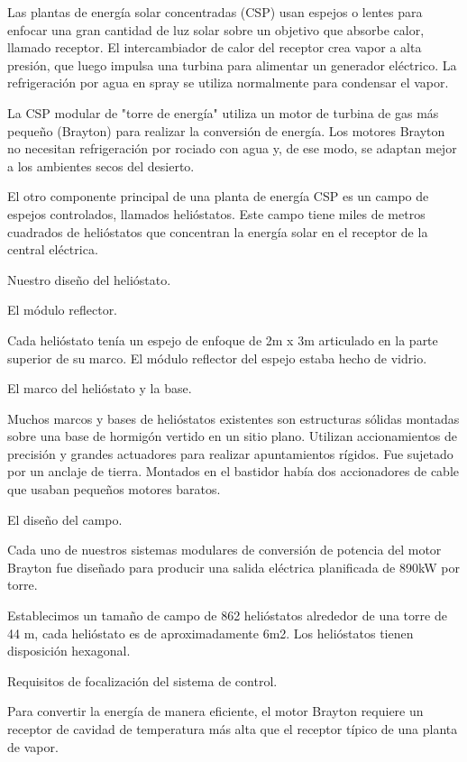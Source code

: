 \documentclass[12pt]{article}
\begin{document}
Las plantas de energía solar concentradas (CSP) usan espejos o lentes para enfocar una gran cantidad de luz solar sobre un objetivo que absorbe calor, llamado receptor. El intercambiador de calor del receptor crea vapor a alta presión, que luego impulsa una turbina para alimentar un generador eléctrico. La refrigeración por agua en spray se utiliza normalmente para condensar el vapor.

La CSP modular de "torre de energía" utiliza un motor de turbina de gas más pequeño (Brayton) para realizar la conversión de energía. Los motores Brayton no necesitan refrigeración por rociado con agua y, de ese modo, se adaptan mejor a los ambientes secos del desierto.

El otro componente principal de una planta de energía CSP es un campo de espejos controlados, llamados helióstatos. Este campo tiene miles de metros cuadrados de helióstatos que concentran la energía solar en el receptor de la central eléctrica.

Nuestro diseño del helióstato.

El módulo reflector.

Cada helióstato tenía un espejo de enfoque de 2m x 3m articulado en la parte superior de su marco. El módulo reflector del espejo estaba hecho de vidrio.

El marco del helióstato y la base.

Muchos marcos y bases de helióstatos existentes son estructuras sólidas montadas sobre una base de hormigón vertido en un sitio plano. Utilizan accionamientos de precisión y grandes actuadores para realizar apuntamientos rígidos. Fue sujetado por un anclaje de tierra. Montados en el bastidor había dos accionadores de cable que usaban pequeños motores baratos.

El diseño del campo.

Cada uno de nuestros sistemas modulares de conversión de potencia del motor Brayton fue diseñado para producir una salida eléctrica planificada de 890kW por torre.

Establecimos un tamaño de campo de 862 helióstatos alrededor de una torre de 44 m, cada helióstato es de aproximadamente 6m2. Los helióstatos tienen disposición hexagonal.

Requisitos de focalización del sistema de control.

Para convertir la energía de manera eficiente, el motor Brayton requiere un receptor de cavidad de temperatura más alta que el receptor típico de una planta de vapor.
\end{document}
